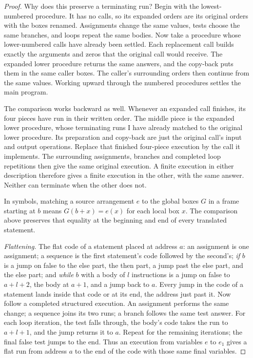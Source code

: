 \documentclass[11pt,twoside]{article}
\theoremstyle{thielethm}
\theoremstyle{thieledef}
\theoremstyle{thieledef}
\theoremstyle{thieledef}
\theoremstyle{thielethm}
\theoremstyle{thieleobs}
\theoremstyle{thielethm}
\begin{document}
\begin{proof}
Why does this preserve a terminating run? Begin with the lowest-numbered
procedure. It has no calls, so its expanded orders are its original orders
with the boxes renamed. Assignments change the same values, tests choose
the same branches, and loops repeat the same bodies. Now take a procedure
whose lower-numbered calls have already been settled. Each replacement call
builds exactly the arguments and zeros that the original call would receive.
The expanded lower procedure returns the same answers, and the copy-back
puts them in the same caller boxes. The caller's surrounding orders then
continue from the same values. Working upward through the numbered procedures
settles the main program.

The comparison works backward as well. Whenever an expanded call finishes,
its four pieces have run in their written order. The middle piece is the
expanded lower procedure, whose terminating runs I have already matched to
the original lower procedure. Its preparation and copy-back are just the
original call's input and output operations. Replace that finished four-piece
execution by the call it implements. The surrounding assignments, branches
and completed loop repetitions then give the same original execution.
A finite execution in either description therefore gives a finite execution
in the other, with the same answer. Neither can terminate when the other does
not.

In symbols, matching a source arrangement $e$ to the global boxes $G$ in a
frame starting at $b$ means $G(b+x)=e(x)$ for each local box $x$. The comparison
above preserves that equality at the beginning and end of every translated
statement.

\emph{Flattening.} The flat code of a statement placed at address $a$: an assignment is one
assignment; a sequence is the first statement's code followed by the second's; \emph{if} $b$ is a
jump on false to the else part, the then part, a jump past the else part, and the else part; and
\emph{while} $b$ with a body of $l$ instructions is a jump on false to $a + l + 2$, the body at
$a + 1$, and a jump back to $a$. Every jump in the code of a statement lands inside that code or
at its end, the address just past it. Now follow a completed structured execution.
An assignment performs the same change; a sequence joins its two runs; a branch
follows the same test answer. For each loop iteration, the test falls through,
the body's code takes the run to $a+l+1$, and the jump returns it to $a$.
Repeat for the remaining iterations; the final false test jumps to the end.
Thus an execution from variables $e$ to $e_1$ gives a flat run from address $a$
to the end of the code with those same final variables.


\end{proof}
\end{document}
